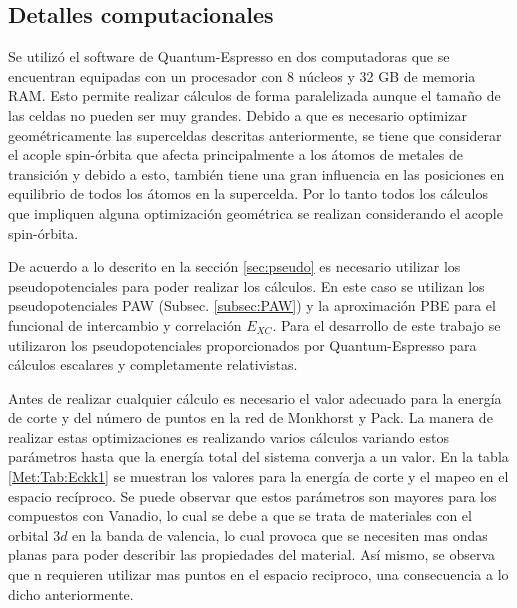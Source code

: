 \subsection{Detalles computacionales} \label{Met:subsec:detcomp}
  Se utiliz\'o el software de Quantum-Espresso en dos computadoras que se encuentran equipadas con un procesador con 8 n\'ucleos y 32 GB de memoria RAM. Esto permite realizar c\'alculos de forma paralelizada aunque el tama\~no de las celdas no pueden ser muy grandes. Debido a que es necesario optimizar geom\'etricamente las superceldas descritas anteriormente, se tiene que considerar el acople spin-\'orbita que afecta principalmente a los \'atomos de metales de transici\'on  y debido a esto, tambi\'en tiene una gran influencia en las posiciones en equilibrio de todos los \'atomos en la supercelda. Por lo tanto todos los c\'alculos que impliquen  alguna optimizaci\'on geom\'etrica se realizan considerando el acople spin-\'orbita.
  \newline
  \par De acuerdo a lo descrito en la secci\'on \ref{sec:pseudo} es necesario utilizar los pseudopotenciales para poder realizar los c\'alculos. En este caso se utilizan los pseudopotenciales PAW (Subsec. \ref{subsec:PAW}) y la aproximaci\'on PBE para el funcional de intercambio y correlaci\'on $E_{XC}$. Para el desarrollo de este trabajo se utilizaron los pseudopotenciales proporcionados por Quantum-Espresso  para c\'alculos escalares  y  completamente relativistas.
  \newline
  \par Antes de realizar cualquier c\'alculo es necesario el valor adecuado para la energ\'ia de corte y del n\'umero de puntos en la red de Monkhorst y Pack. La manera de realizar estas optimizaciones es realizando varios c\'alculos variando estos par\'ametros hasta que la energ\'ia total del sistema converja a un valor. En la tabla \ref{Met:Tab:Eckk1} se muestran los valores para la energ\'ia de corte  y el mapeo en el espacio rec\'iproco. Se puede observar que estos par\'ametros son mayores para los compuestos con Vanadio, lo cual se debe a que se trata de materiales con el orbital $3d$ en la banda de valencia, lo cual provoca que se necesiten mas ondas planas para poder describir las propiedades del material. As\'i mismo, se observa que n requieren utilizar mas puntos en el espacio reciproco,  una consecuencia a lo dicho anteriormente.  

